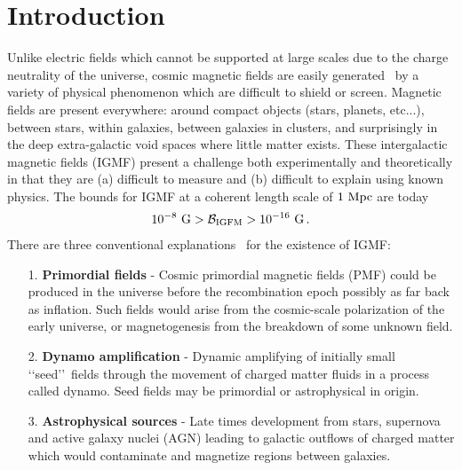 \documentclass[a4paper]{article}
\begin{document}
\section{Introduction}\label{sec:Introduction}
\noindent Unlike electric fields which cannot be supported at large scales due to the charge neutrality of the universe, cosmic magnetic fields are easily generated~\cite{kronberg1994extragalactic,gaensler2004origin,durrer2013cosmological} by a variety of physical phenomenon which are difficult to shield or screen. Magnetic fields are present everywhere: around compact objects (stars, planets, etc...), between stars, within galaxies, between galaxies in clusters, and surprisingly in the deep extra-galactic void spaces where little matter exists. These intergalactic magnetic fields (IGMF) present a challenge both experimentally and theoretically in that they are (a) difficult to measure and (b) difficult to explain using known physics. The bounds for IGMF at a coherent length scale of $1{\rm\ Mpc}$ are today~\cite{neronov2010evidence,taylor2011extragalactic,vernstrom2021discovery}
\begin{align}
    10^{-8}{\rm\ G}>\mathcal{B}_{\rm IGFM}>10^{-16}{\rm\ G}\,.
\end{align}
There are three conventional explanations~\cite{batista2021gammaray} for the existence of IGMF:
\begin{itemize}
    \item [1.] \textbf{Primordial fields} - Cosmic primordial magnetic fields (PMF) could be produced in the universe before the recombination epoch possibly as far back as inflation. Such fields would arise from the cosmic-scale polarization of the early universe, or magnetogenesis from the breakdown of some unknown field.
    \item [2.] \textbf{Dynamo amplification} - Dynamic amplifying of initially small \lq\lq seed\rq\rq\ fields through the movement of charged matter fluids in a process called dynamo. Seed fields may be primordial or astrophysical in origin.
    \item [3.] \textbf{Astrophysical sources} - Late times development from stars, supernova and active galaxy nuclei (AGN) leading to galactic outflows of charged matter which would contaminate and magnetize regions between galaxies.
\end{itemize}
\end{document}
